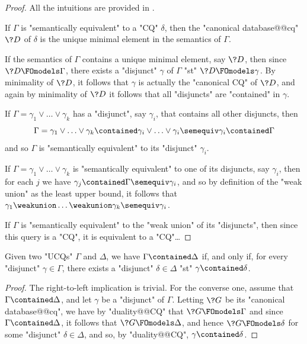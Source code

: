 \begin{proof}
	All the intuitions are provided in .
	
	 If $\Gamma$ is "semantically equivalent"
	to a "CQ" $\delta$, then the "canonical database@@cq" $\?D$ of $\delta$ is
	the unique minimal element in the semantics of $\Gamma$.

	 If the semantics of $\Gamma$
	contains a unique minimal element, say $\?D$, then since $\?D \FOmodels \Gamma$,
	there exists a "disjunct" $\gamma$ of $\Gamma$ "st" $\?D \FOmodels \gamma$.
	By minimality of $\?D$, it follows that $\gamma$ is actually the "canonical CQ" of $\?D$,
	and again by minimality of $\?D$ it follows that all "disjuncts" are "contained" in $\gamma$.

	 If $\Gamma = \gamma_1 \lor \dotsc \lor \gamma_k$
	has a "disjunct", say $\gamma_i$, that contains all other disjuncts, then
	\[
		\Gamma = \gamma_1 \lor \dotsc \lor \gamma_k \contained
		\gamma_i \lor \dotsc \lor \gamma_i \semequiv \gamma_i \contained \Gamma
	\]
	and so $\Gamma$ is "semantically equivalent" to its "disjunct" $\gamma_i$.

	 If $\Gamma = \gamma_1 \lor \dotsc \lor \gamma_k$ is "semantically equivalent" to
	one of its disjuncts, say $\gamma_i$, then
	for each $j$ we have $\gamma_j \contained \Gamma \semequiv \gamma_i$,
	and so by definition of the "weak union" as the least upper bound,
	it follows that $\gamma_1 \weakunion \dotsc \weakunion \gamma_k \semequiv \gamma_i$.

	 If $\Gamma$ is "semantically equivalent" to the
	"weak union" of its "disjuncts", then since this query is a "CQ", it
	is equivalent to a "CQ"…
\end{proof}

\begin{proposition}
	Given two "UCQs" $\Gamma$ and $\Delta$, we have $\Gamma \contained \Delta$
	if, and only if, for every "disjunct" $\gamma \in \Gamma$, there exists
	a "disjunct" $\delta \in \Delta$ "st" $\gamma \contained \delta$.
\end{proposition}

\begin{proof}
	The right-to-left implication is trivial.
	For the converse one, assume that $\Gamma \contained \Delta$,
	and let $\gamma$ be a "disjunct" of $\Gamma$.
	Letting $\?G$ be its "canonical database@@cq", we have by "duality@@CQ" that
	$\?G \FOmodels \Gamma$
	and since $\Gamma \contained \Delta$, it follows that $\?G \FOmodels \Delta$,
	and hence $\?G \FOmodels \delta$ for some "disjunct" $\delta \in \Delta$,
	and so, by "duality@@CQ", $\gamma \contained \delta$. 
\end{proof}

